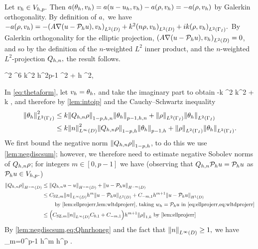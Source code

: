 Let $v_{h} \in V_{h,p}.$ Then $a(\theta_{h},v_{h}) = a(u-u_{h},v_{h}) - a(\rho,v_{h}) = -a(\rho,v_{h})$ by Galerkin orthogonality. By definition of $a,$ we have $-a(\rho,\vh) = -\IPLtD{A\grad\mleft(u-\Ph u\mright)}{\vh} + k^2 \IPLtD{n\rho}{\vh} + ik\IPLtGI{\rho}{\vh}.$ By Galerkin orthogonality for the elliptic projection, $\IPLtD{A\grad\mleft(u-\Ph u\mright)}{\vh} = 0$, and so by the definition of the $n$-weighted $L^2$ inner product, and the $n$-weighted $L^2$-projection $Q_{h,n},$ the result follows.
\epf

\label{lem:boundarybound}
\beq\label{eq:boundarybound}
\NLtGI{\thetah}^2 \leq \Cboundaryo {}^6 k^2 h^{2p-1} ^2 + \Cboundaryt h \NW{\rho}^2,
\eeq
\ele

In \cref{eq:thetaform}, let $v_{h} = \theta_{h},$ and take the imaginary part to obtain
\beqs
-k \NLtGI{\thetah}^2 \leq \Im k^2 \IPLtDn{\Qhn \rho}{\thetah} + \Re k \IPLtGI{\rho}{\thetah},
\eeqs
and therefore by \cref{lem:intoip} and the Cauchy--Schwartz inequality
\begin{align}
\NLtGI{\thetah}^2 &\leq  k \Nfn{1-p,h,n}{\Qhn \rho}\Nfn{p-1,h,n}{\thetah} + \NLtGI{\rho}\NLtGI{\thetah}\nonumber\\
&\leq  k \NLiD{n}^2 \Nfn{1-p,h}{\Qhn \rho}\Nfn{p-1,h}{\thetah} + \NLtGI{\rho}\NLtGI{\thetah}.\label{eq:thetaboundarypart}
\end{align}
We first bound the negative norm $\Nfn{1-p,h}{\Qhn\rho}$, to do this we use \cref{lem:negdiscsum}; however, we therefore need to estimate negative Sobolev norms of $Q_{h,n}\rho$; for integers $m \in [0,p-1]$ we have (observing that $Q_{h,n} \mathcal P_{h} u = \mathcal P_{h} u$ as $\mathcal P_{h} u \in V_{h,p}.$)
\begin{align}
\NHmmD{\Qhn\rho} &\leq \NHmmD{\Qhn u - u} + \NHmmD{u - \Ph u}\nonumber\\
&\leq \CSZfn{m} \NLiD{n} h^m \NLtD{u-\Ph u} + \Cmmo h^{m+1} \NHoD{u - \Ph u}\\
&\quad\quad\text{ by \cref{lem:ellprojerr,lem:wltdprojerr}, taking } \wh = \Ph u \text{ in \cref{eq:ellprojerr,eq:wltdprojerr}}\nonumber\\
&\leq \mleft(\CSZfn{m} \NLiD{n}\Cfn{0,1} + \Cfn{-m,1}\mright) h^{m+1} \NW{\rho} \text{ by \cref{lem:ellprojerr}}\label{eq:Qhnrhoneg}
\end{align}
By \cref{lem:negdiscsum,eq:Qhnrhoneg} and the fact that $\NLiD{n} \geq 1,$ we have
\beq\label{eq:Qhnrhosum}
\leq {} \sum_{m=0}^{p-1} h^{m}  \leq \Cmess {}h^p \NW{\rho}.
